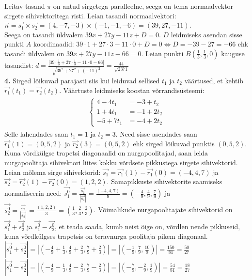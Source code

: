 \documentclass{article}
\begin{document}
Leitav tasand $\pi$ on antud sirgetega paralleelne, seega on tema normaalvektor sirgete sihivektoritega risti. Leian tasandi normaalvektori: $\vec{n}=\vec{s_1}\times\vec{s_2}=(4,-7,-3)\times(-1,-1,-6)=(39,27,-11)$.\\
Seega on tasandi üldvalem $39x+27y-11z+D=0$. $D$ leidmiseks asendan sisse punkti $A$ koordinaadid: $39\cdot1+27\cdot3-11\cdot0+D=0 \Leftrightarrow D=-39-27=-66$ ehk tasandi üldvalem on $39x+27y-11z-66=0$.
Leian punkti  $B(\frac13,\frac13,0)$ kauguse tasandist: $d=\frac{|39\cdot\frac13+27\cdot\frac13-11\cdot0-66|}{\sqrt{39^2+27^2+(-11)^2}}=\frac{44}{\sqrt{2371}}$\pagebreak\\
\textbf{4.} Sirged lõikuvad parajasti siis kui leiduvad sellised $t_1$ ja $t_2$ väärtused, et kehtib $\vec{r_1}(t_1)=\vec{r_2}(t_2)$. Väärtuste leidmiseks koostan võrrandisüsteemi:
\begin{gather*}
\begin{aligned}
\left\{\begin{aligned}
4-4t_1&=-3+t_2\\
1+4t_1&=-1+2t_2\\
-5+7t_1&=-4+2t_2
\end{aligned}\right.
\end{aligned}
\end{gather*}
Selle lahendades saan $t_1=1$ ja $t_2=3$. Need sisse asendades saan $\vec{r_1}(1)=(0,5,2)$ ja $\vec{r_2}(3)=(0,5,2)$ ehk sirged lõikuvad punktis $(0,5,2)$.\\
Kuna võrdkülgse trapetsi diagonaalid on nurgapoolitajad, saan leida nurgapoolitaja sihivektori liites kokku võrdsete pikkustega sirgete sihivektorid. Leian mõlema sirge sihivektorid: $\vec{s_1}=\vec{r_1}(1)-\vec{r_1}(0)=(-4,4,7)$ ja $\vec{s_2}=\vec{r_2}(1)-\vec{r_2}(0)=(1,2,2)$. Samapikkuste sihivektorite saamiseks normaliseerin need: $\vec{s_1^0}=\frac{\vec{s_1}}{|\vec{s_1}|}=\frac{(-4,4,7)}{9}=\left(-\frac49,\frac49,\frac79\right)$ ja $\vec{s_2^0}=\frac{\vec{s_2}}{|\vec{s_2}|}=\frac{(1,2,2)}{3}=\left(\frac13,\frac23,\frac23\right)$. Võimalikude nurgapoolitajate sihivektorid on $\vec{s_1^0}+\vec{s_2^0}$ ja $\vec{s_1^0}-\vec{s_2^0}$, et teada saada, kumb neist õige on, võrdlen nende pikkuseid, kuna võrdkülgses trapetsis on teravnurga poolitaja pikem diagonaal.\\ $|\vec{s_1^0}+\vec{s_2^0}|=\left|\left(-\frac49+\frac13,\frac49+\frac23,\frac79+\frac23\right)\right|=\left|\left(-\frac19,\frac79,\frac{10}{9}\right)\right|=\frac{150}{81}=\frac{50}{27}$\\
$|\vec{s_1^0}-\vec{s_2^0}|=\left|\left(-\frac49-\frac13,\frac49-\frac23,\frac79-\frac23\right)\right|=\left|\left(-\frac79,-\frac29,\frac19\right)\right|=\frac{54}{81}=\frac{18}{27}$\\
\end{document}

